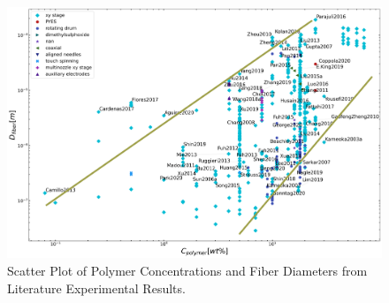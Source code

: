 \begin{figure}[!th]
\centering
\includegraphics[width=\textwidth]{./Figures/plt_Cpolymerwt_vs_Dfiberm.png}
\decoRule
\caption[Scatter Plot of Polymer Concentrations and Fiber Diameters from Literature Experimental Results]{Scatter Plot of Polymer Concentrations and Fiber Diameters from Literature Experimental Results. \cite{
  Yang2019,Fattahi2017,Shin2019,Wang2015,Parajuli2016,Zheng2010,Fuh2011,Dalton2015,
  Ru2014,Xue2014,Wang2017,Xu2014,Liu2013,Pan2014,Canton2014,Chakraborty2009,Gupta2007,
  He2018,Zhou2011,Chen2013,Williams2018,Choi2017,Pan2019,Lei2015,Lim2019,Park2020,
  Fuh2012,Flores2017,Chang2010,Xu2019,Zhang2019,Shin2018,Fuh2015,Nagle2019,Zheng2012,
  Kameoka2003a,Liu2014,E.King2019,Hochleitner2017,Madou2011,Jiang2018,Husain2016,
  ElectrospinTech2015,Brown2011,Kolan2018,Chang2011,Beachley2011,Camillo2013,Kameoka2003,
  Bu2012,Lee2012,Huang2015,Coppola2020,CisquellaSerra2019,Ruggieri2013,Hochleitner2014,
  Zhu2016,Brown2014,Chang2008,Sonntag2020,Kim2018,Deng2020,Han2019,George2020,Sun2006a,
  Pan2015,Shen2016,Strauss2019,Fuh2013,Sarkar2007,You2017,Wang2018a,Zheng2014,Song2015,
  GaofengZheng2010,Liu2015a,Min2013,Luo2016,Yousefi2019,Cardenas2017,Coppola2014}}
\label{fig:plt_Cpolymerwt_vs_Dfiberm}
\end{figure}

